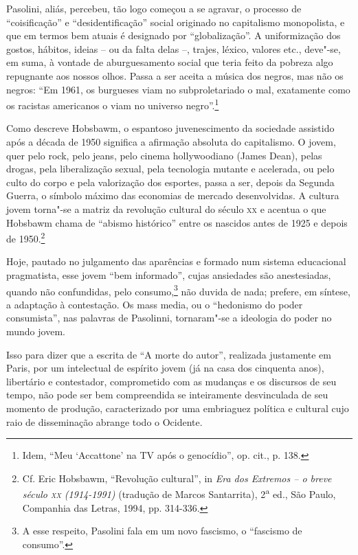 Pasolini, aliás, percebeu, tão logo começou a se agravar, o processo de
``coisificação'' e ``desidentificação'' social originado no capitalismo
monopolista, e que em termos bem atuais é designado por
``globalização''. A uniformização dos gostos, hábitos, ideias -- ou da
falta delas --, trajes, léxico, valores etc., deve"-se, em suma, à
vontade de aburguesamento social que teria feito da pobreza algo
repugnante aos nossos olhos. Passa a ser aceita a música dos negros, mas
não os negros: ``Em 1961, os burgueses viam no subproletariado o mal,
exatamente como os racistas americanos o viam no universo
negro''.\footnote{Idem, ``Meu `Accattone' na TV após o genocídio'', op.
  cit., p. 138.}

Como descreve Hobsbawm, o espantoso juvenescimento da sociedade
assistido após a década de 1950 significa a afirmação absoluta do
capitalismo. O jovem, quer pelo rock, pelo jeans, pelo cinema
hollywoodiano (James Dean), pelas drogas, pela liberalização sexual,
pela tecnologia mutante e acelerada, ou pelo culto do corpo e pela
valorização dos esportes, passa a ser, depois da Segunda Guerra, o
símbolo máximo das economias de mercado desenvolvidas. A cultura jovem
torna"-se a matriz da revolução cultural do século \textsc{xx} e acentua
o que Hobsbawm chama de ``abismo histórico'' entre os nascidos antes de
1925 e depois de 1950.\footnote{Cf. Eric Hobsbawm, ``Revolução
  cultural'', in \emph{Era dos Extremos -- o breve século \textsc{xx}
  (1914-1991)} (tradução de Marcos Santarrita), 2\textsuperscript{a}
  ed., São Paulo, Companhia das Letras, 1994, pp. 314-336.}

Hoje, pautado no julgamento das aparências e formado num sistema
educacional pragmatista, esse jovem ``bem informado'', cujas ansiedades
são anestesiadas, quando não confundidas, pelo consumo,\footnote{A esse
  respeito, Pasolini fala em um novo fascismo, o ``fascismo de
  consumo''.} não duvida de nada; prefere, em síntese, a adaptação à
contestação. Os mass media, ou o ``hedonismo do poder consumista'', nas
palavras de Pasolinni, tornaram"-se a ideologia do poder no mundo jovem.

Isso para dizer que a escrita de ``A morte do autor'', realizada
justamente em Paris, por um intelectual de espírito jovem (já na casa
dos cinquenta anos), libertário e contestador, comprometido com as
mudanças e os discursos de seu tempo, não pode ser bem compreendida se
inteiramente desvinculada de seu momento de produção, caracterizado por
uma embriaguez política e cultural cujo raio de disseminação abrange
todo o Ocidente.

